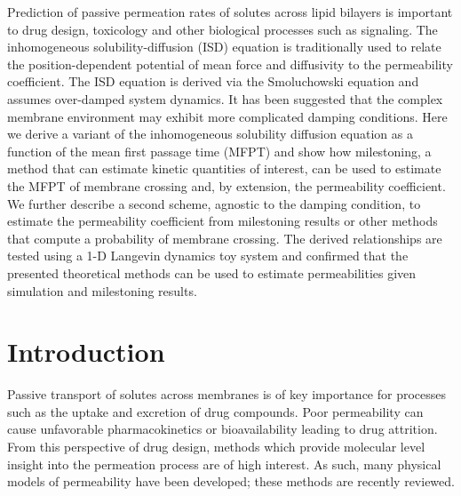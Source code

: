 \par Prediction of passive permeation rates of solutes across lipid bilayers is important to drug design, toxicology and other biological processes such as signaling. The inhomogeneous solubility-diffusion (ISD) equation is traditionally used to relate the position-dependent potential of mean force and diffusivity to the permeability coefficient. The ISD equation is derived via the Smoluchowski equation and assumes over-damped system dynamics. It has been suggested that the complex membrane environment may exhibit more complicated damping conditions. Here we derive a variant of the inhomogeneous solubility diffusion equation as a function of the mean first passage time (MFPT) and show how milestoning, a method that can estimate kinetic quantities of interest, can be used to estimate the MFPT of membrane crossing and, by extension, the permeability coefficient. We further describe a second scheme, agnostic to the damping condition, to estimate the permeability coefficient from milestoning results or other methods that compute a probability of membrane crossing. The derived relationships are tested using a 1-D Langevin dynamics toy system and confirmed that the presented theoretical methods can be used to estimate permeabilities given simulation and milestoning results.

    \section{Introduction}
    \par Passive transport of solutes across membranes is of key importance for processes such as the uptake and excretion of drug compounds. Poor permeability can cause unfavorable pharmacokinetics or bioavailability leading to drug attrition\cite{Kola2004}. From this perspective of drug design, methods which provide molecular level insight into the permeation process are of high interest. As such, many physical models of permeability have been developed; these methods are recently reviewed\cite{Swift2013}.


